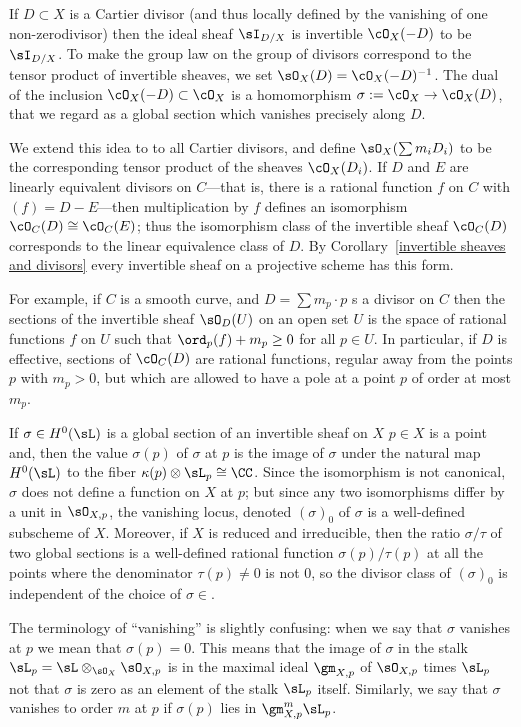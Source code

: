 If $D\subset X$ is a Cartier divisor (and thus locally defined by the vanishing of one non-zerodivisor) then the ideal sheaf $\sI_{D/X}$
is invertible $\cO_X(-D)$ to be $\sI_{D/X}$. To make the group law on the group of divisors correspond to the
tensor product of invertible sheaves, we set $\sO_X(D) =\cO_X(-D)^{-1}$. The dual of the inclusion
$\cO_X(-D) \subset \cO_X$ is a homomorphism $\sigma := \cO_X \to \cO_X(D)$, that we regard as a global section which
vanishes precisely along $D$. 

We extend this idea to to all Cartier divisors, and define $\sO_X(\sum m_iD_i)$ to be the corresponding tensor
product of the sheaves $\cO_X(D_i)$. If $D$ and $E$ are linearly equivalent divisors on $C$---that is, there is a rational function $f$ on $C$ with $(f) = D - E$---then multiplication by $f$ defines an isomorphism $\cO_C(D) \cong \cO_C(E)$; thus the isomorphism class of the invertible sheaf $\cO_C(D)$ corresponds to the linear equivalence class of $D$. By Corollary~\ref{invertible sheaves and divisors} every invertible sheaf on a projective scheme has this form.

For example, if $C$ is a smooth curve, and $D = \sum m_p\cdot p$ s a divisor on $C$ then the sections of the invertible sheaf
$\sO_D(U)$ on an open set $U$ is the space of rational functions $f$ on $U$ such that $\ord_p(f) + m_p \geq 0$ for all $p \in U$. 
In particular, if $D$ is effective, sections of $\cO_C(D)$ are rational functions, regular away from the points $p$ with $m_p > 0$, but which are allowed to have a pole at a point $p$ of order at most $m_p$. 

If $\sigma\in H^0(\sL)$ is a global section of an invertible sheaf on $X$  $p\in X$ is a point and, then the value $\sigma(p)$ of $\sigma$ at $p$ is the image  of $\sigma$ under the natural map $H^0(\sL)$ to the fiber $\kappa(p) \otimes \sL_{p} \cong \CC$.
Since the isomorphism is not canonical, $\sigma$ does not define a function on $X$ at $p$; but since any two isomorphisms
differ by a unit in $\sO_{X,p}$, the vanishing locus, denoted $(\sigma)_0$ of $\sigma$ is a well-defined subscheme of $X$. Moreover, if $X$ is reduced and irreducible, then the ratio $\sigma/\tau$ of two global sections is a well-defined rational function
$\sigma(p)/\tau(p)$ at all the points where the denominator $\tau(p)\neq 0$ is not 0, so the divisor class of 
$(\sigma)_0$ is independent of the choice of $\sigma \in $.

The terminology of ``vanishing'' is slightly confusing: when we  say that $\sigma$ vanishes at $p$ we mean
that $\sigma(p) = 0$. This means that the image of $\sigma$ in the stalk $\sL_p = \sL \otimes_{\sO_{X}} \sO_{X,p}$ is in 
the maximal ideal $\gm_{X,p}$ of $\sO_{X,p}$ times $\sL_p$
not that $\sigma$ is zero
as an element of the stalk $\sL_p$ itself. Similarly, we say that $\sigma$ vanishes to order $m$ at $p$ if $\sigma(p)$ lies in $\gm_{X,p}^m\sL_p$. 

